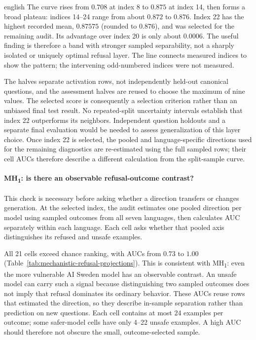 \begin{otherlanguage*}{english}
The curve rises from $0.708$ at index 8 to $0.875$ at index 14, then forms a broad plateau: indices 14--24 range from about $0.872$ to $0.876$. Index 22 has the highest recorded mean, $0.87575$ (rounded to $0.876$), and was selected for the remaining audit. Its advantage over index 20 is only about $0.0006$. The useful finding is therefore a band with stronger sampled separability, not a sharply isolated or uniquely optimal refusal layer. The line connects measured indices to show the pattern; the intervening odd-numbered indices were not measured.

The halves separate activation rows, not independently held-out canonical questions, and the assessment halves are reused to choose the maximum of nine values. The selected score is consequently a selection criterion rather than an unbiased final test result. No repeated-split uncertainty intervals establish that index 22 outperforms its neighbors. Independent question holdouts and a separate final evaluation would be needed to assess generalization of this layer choice. Once index 22 is selected, the pooled and language-specific directions used for the remaining diagnostics are re-estimated using the full sampled rows; their cell AUCs therefore describe a different calculation from the split-sample curve.



\paragraph*{MH\textsubscript{1}: is there an observable refusal-outcome contrast?} This check is necessary before asking whether a direction transfers or changes generation. At the selected index, the audit estimates one pooled direction per model using sampled outcomes from all seven languages, then calculates AUC separately within each language. Each cell asks whether that pooled axis distinguishes its refused and unsafe examples.

All 21 cells exceed chance ranking, with AUCs from $0.73$ to $1.00$ (Table~\ref{tab:mechanistic-refusal-projections}). This is consistent with MH\textsubscript{1}: even the more vulnerable AI Sweden model has an observable contrast. An unsafe model can carry such a signal because distinguishing two sampled outcomes does not imply that refusal dominates its ordinary behavior. These AUCs reuse rows that estimated the direction, so they describe in-sample separation rather than prediction on new questions. Each cell contains at most 24 examples per outcome; some safer-model cells have only 4--22 unsafe examples. A high AUC should therefore not obscure the small, outcome-selected sample.


\end{otherlanguage*}
